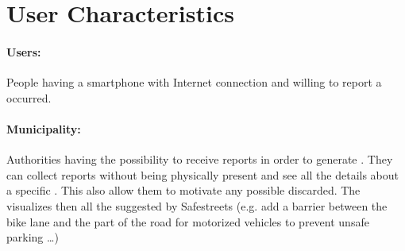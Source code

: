 \documentclass[../../rasd.tex]{subfiles}
\begin{document}
	
	\section{User Characteristics}

		\paragraph{Users:}
		People having a smartphone with Internet connection and willing to report a  occurred. 
		\paragraph{Municipality:}
		Authorities having the possibility to receive  reports in order to generate . They can collect reports without being physically present and see all the details about a specific . This also allow them to motivate any possible  discarded. The  visualizes then all the  suggested by Safestreets (e.g. add a barrier between the bike lane and the part of the road for motorized vehicles to prevent unsafe parking …) 
		
		
\end{document}
